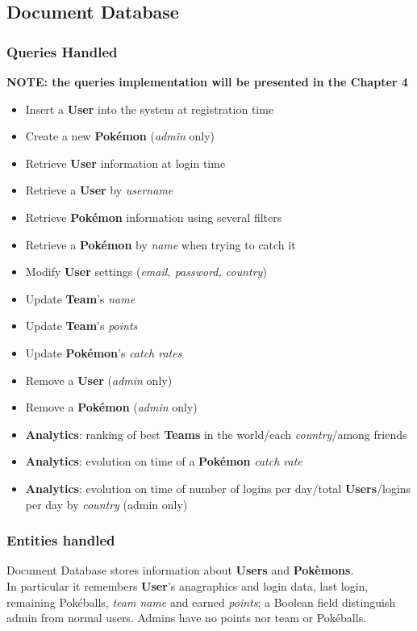 \subsection{Document Database}
\subsubsection{Queries Handled}
\textbf{NOTE: the queries implementation will be presented in the Chapter 4}
\begin{itemize}
	\item Insert a \textbf{User} into the system at registration time
	\item Create a new \textbf{Pokémon} (\textit{admin} only)
	\item Retrieve \textbf{User} information at login time
	\item Retrieve a \textbf{User} by \textit{username}
	\item Retrieve \textbf{Pokémon} information using several filters
	\item Retrieve a \textbf{Pokémon} by \textit{name} when trying to catch it
	\item Modify \textbf{User} settings (\textit{email, password, country})
	\item Update \textbf{Team}’s \textit{name}
	\item Update \textbf{Team}’s \textit{points}
	\item Update \textbf{Pokémon}’s \textit{catch rates} 
	\item Remove a \textbf{User} (\textit{admin} only)
	\item Remove a \textbf{Pokémon} (\textit{admin} only)
	\item \textbf{Analytics}: ranking of best \textbf{Teams} in the world/each \textit{country}/among friends
	\item \textbf{Analytics}: evolution on time of a \textbf{Pokémon} \textit{catch rate}
	\item \textbf{Analytics}: evolution on time of number of logins per day/total \textbf{Users}/logins per day by \textit{country} (admin only)
\end{itemize}
\subsubsection{Entities handled}
Document Database stores information about \textbf{Users} and \textbf{Pokèmons}. \medspace \\ 

In particular it remembers \textbf{User}’s anagraphics and login data, last login, remaining Pokéballs, \textit{team name} and earned \textit{points}; a Boolean field distinguish admin from normal users. Admins have no points nor team or Pokéballs.\\

